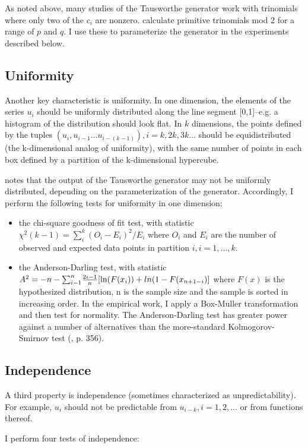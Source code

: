 \documentclass[12pt]{amsart}
\begin{document}
As noted above, many studies of the Tausworthe generator work with trinomials where only two of the $c_i$ are nonzero.  \cite{ZierlerBrillhart} calculate primitive trinomials mod 2 for a range of $p$ and $q$. I use these to parameterize the generator in the experiments described below. 

\subsection{Uniformity}

Another key characteristic is uniformity. In one dimension, the elements of the series ${u_i}$ should be uniformly distributed along the line segment [0,1]--e.g. a histogram of the distribution should look flat. In $k$ dimensions, the points defined by the tuples ${(u_i,u_{i-1}\ldots u_{i-(k-1)}), i = k, 2k, 3k\ldots}$ should be equidistributed (the k-dimensional analog of uniformity), with the same number of points in each box defined by a partition of the k-dimensional hypercube. 

\cite{LEcuyer1994} notes that the output of the Tausworthe generator may not be uniformly distributed, depending on the parameterization of the generator. Accordingly, I perform the following tests for uniformity in one dimension: 
\begin{itemize} 
\item the chi-square goodness of fit test, with statistic $\chi^2 (k-1)= \sum_i ^k (O_i - E_i)^2/E_i$ where $O_i$ and $E_i$ are the number of observed and expected data points in partition $i, i=1,\ldots,k. $
\item the Anderson-Darling test, with statistic $A^2 = -n-{\sum_{i-1} ^n} {{2i-1}\over{n}} [ \ln(F(x_i))+ ln(1-F(x_{n+1-i})]$ where $F(x)$ is the hypothesized distribution, n is the sample size and the sample is sorted in increasing order. In the empirical work, I apply a Box-Muller transformation and then test for normality. The Anderson-Darling test has greater power against a number of alternatives than the more-standard Kolmogorov-Smirnov test (\cite{Law2015}, p. 356).
\end{itemize}
\subsection{Independence}
A third property is independence (sometimes characterized as unpredictability). For example, $u_i$ should not be predictable from $u_{i-k}, i=1,2,...$ or from functions thereof. 

I perform four tests of independence:
\end{document}
